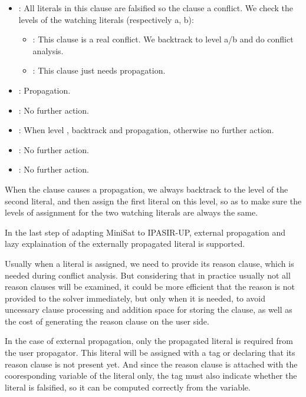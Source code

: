\begin{itemize}
  \item {}: All literals in this clause are falsified so the clause a conflict. We check the levels of the watching literals (respectively a, b):
  \begin{itemize}
    \item {}: This clause is a real conflict. We backtrack to level a/b and do conflict analysis.
    \item {}: This clause just needs propagation.
  \end{itemize}
  \item {}: Propagation.
  \item {}: No further action.
  \item {}: When level , backtrack and propagation, otherwise no further action.
  \item {}: No further action.
  \item {}: No further action.
\end{itemize}

When the clause causes a propagation, we always backtrack to the level of the second literal, and then assign the first literal on this level, so as to make sure the levels of assignment for the two watching literals are always the same.


In the last step of adapting MiniSat to IPASIR-UP, external propagation and lazy explaination of the externally propagated literal is supported.

Usually when a literal is assigned, we need to provide its reason clause, which is needed during conflict analysis. But considering that in practice usually not all reason clauses will be examined, it could be more efficient that the reason is not provided to the solver immediately, but only when it is needed, to avoid uncessary clause processing and addition space for storing the clause, as well as the cost of generating the reason clause on the user side.

In the case of external propagation, only the propagated literal is required from the user propagator. This literal will be assigned with a tag  or  declaring that its reason clause is not present yet. And since the reason clause is attached with the cooresponding variable of the literal only, the tag must also indicate whether the literal is falsified, so it can be computed correctly from the variable.

